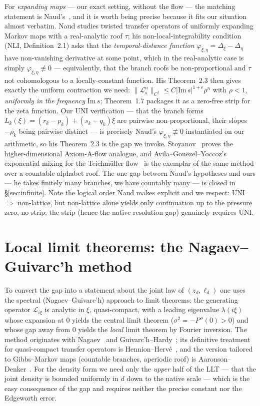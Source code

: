 \documentclass[11pt]{article}
\newcommand{\Lop}{\mathcal L}
\begin{document}
For \emph{expanding maps} --- our exact setting, without the flow --- the
matching statement is Naud's~\cite{Naud2005}, and it is worth being precise
because it fits our situation almost verbatim. Naud studies twisted transfer
operators of uniformly expanding Markov maps with a real-analytic roof $\tau$;
his non-local-integrability condition (NLI, Definition~2.1) asks that the
\emph{temporal-distance function}
$\varphi_{\xi,\eta}=\Delta_\xi-\Delta_\eta$ have non-vanishing derivative at
some point, which in the real-analytic case is simply
$\varphi_{\xi,\eta}\not\equiv0$ --- equivalently, that the branch roofs be
non-proportional and $\tau$ not cohomologous to a locally-constant function.
His Theorem~2.3 then gives exactly the uniform contraction we need:
$\|\Lop_s^n\|_{C^1}\le C|\mathrm{Im}\,s|^{1+\epsilon}\rho^n$ with $\rho<1$,
\emph{uniformly in the frequency} $\mathrm{Im}\,s$; Theorem~1.7 packages it as a
zero-free strip for the zeta function. Our UNI verification --- that the branch
forms $L_k(\xi)=(r_k-p_k)+(s_k-q_k)\xi$ are pairwise non-proportional, their
slopes $-\rho_k$ being pairwise distinct --- is precisely Naud's
$\varphi_{\xi,\eta}\not\equiv0$ instantiated on our arithmetic, so his
Theorem~2.3 is the gap we invoke. Stoyanov~\cite{Stoyanov2011} proves the
higher-dimensional Axiom-A-flow analogue, and Avila--Gou\"ezel--Yoccoz's
exponential mixing for the Teichm\"uller flow~\cite{AGY2006} is the exemplar of
the same method over a countable-alphabet roof. The one gap between Naud's
hypotheses and ours --- he takes finitely many branches, we have countably
many --- is closed in \S\ref{sec:infinite}. Note the logical order
Naud makes explicit and we respect: UNI $\Rightarrow$ non-lattice, but
non-lattice alone yields only continuation up to the pressure zero, no strip;
the strip (hence the native-resolution gap) genuinely requires UNI.

\section{Local limit theorems: the Nagaev--Guivarc'h method}
\label{sec:llt}

To convert the gap into a statement about the joint law of $(z_d,\ell_d)$ one
uses the spectral (Nagaev--Guivarc'h) approach to limit theorems: the
generating operator $\Lop_{i\xi}$ is analytic in $\xi$, quasi-compact, with a
leading eigenvalue $\lambda(i\xi)$ whose expansion at $0$ yields the central
limit theorem ($\sigma^2=-P''(0)>0$) and whose gap away from $0$ yields the
\emph{local} limit theorem by Fourier inversion. The method originates with
Nagaev~\cite{Nagaev1957} and Guivarc'h--Hardy~\cite{GuivarchHardy1988}; its
definitive treatment for quasi-compact transfer operators is
Hennion--Herv\'e~\cite{HennionHerve2001}, and the version tailored to
Gibbs--Markov maps (countable branches, aperiodic roof) is
Aaronson--Denker~\cite{AaronsonDenker2001}. For the density form we need only
the \emph{upper} half of the LLT --- that the joint density is bounded uniformly
in $d$ down to the native scale --- which is the easy consequence of the gap
and requires neither the precise constant nor the Edgeworth error.
\end{document}
